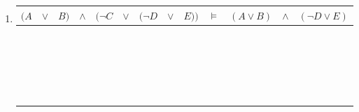 \begin{enumerate}
\begin{enumerate}
\item
\begin{tabular}{ccccccccc|c|ccc}
$(A$ & $\lor$ & $B)$ & $\land$ & $\big(\neg C$ & $\lor$ & $(\neg D$ & $\lor$ & $E)\big)$ & $\vDash$ & $(A \lor B)$ & $\land$ & $(\neg D \lor E)$\\
\hline
\F & \F & \F & \F & \T & \T & \T & \T & \F & \T & \F& \F & \T \\
\F & \F & \F & \F & \T & \T & \T & \T & \T & \T & \F& \F & \T \\
\F & \F & \F & \F & \T & \T & \F & \F & \F & \T & \F& \F & \F \\
\F & \F & \F & \F & \T & \T & \F & \T & \T & \T & \F& \F & \T \\
\F & \F & \F & \F & \F & \T & \T & \T & \F & \T & \F& \F & \T \\
\F & \F & \F & \F & \F & \T & \T & \T & \T & \T & \F& \F & \T \\
\F & \F & \F & \F & \F & \F & \F & \F & \F & \T & \F& \F & \F \\
\F & \F & \F & \F & \F & \T & \F & \T & \T & \T & \F& \F & \T \\
\F & \T & \T & \T & \T & \T & \T & \T & \F & \T & \T& \T & \T \\
\F & \T & \T & \T & \T & \T & \T & \T & \T & \T & \T& \T & \T \\
\F & \T & \T & \T & \T & \T & \F & \F & \F & \F & \T& \F & \F \\
\F & \T & \T & \T & \T & \T & \F & \T & \T & \T & \T& \T & \T \\
\F & \T & \T & \T & \F & \T & \T & \T & \F & \T & \T& \T & \T \\
\F & \T & \T & \T & \F & \T & \T & \T & \T & \T & \T& \T & \T \\
\F & \T & \T & \F & \F & \F & \F & \F & \F & \T & \T& \F & \F \\
\F & \T & \T & \T & \F & \T & \F & \T & \T & \T & \T& \T & \T \\
\T & \T & \F & \T & \T & \T & \T & \T & \F & \T & \T& \T & \T \\
\T & \T & \F & \T & \T & \T & \T & \T & \T & \T & \T& \T & \T \\
\T & \T & \F & \T & \T & \T & \F & \F & \F & \F & \T& \F & \F \\
\T & \T & \F & \T & \T & \T & \F & \T & \T & \T & \T& \T & \T \\
\T & \T & \F & \T & \F & \T & \T & \T & \F & \T & \T& \T & \T \\
\T & \T & \F & \T & \F & \T & \T & \T & \T & \T & \T& \T & \T \\

\end{tabular}
\end{enumerate}
\end{enumerate}
